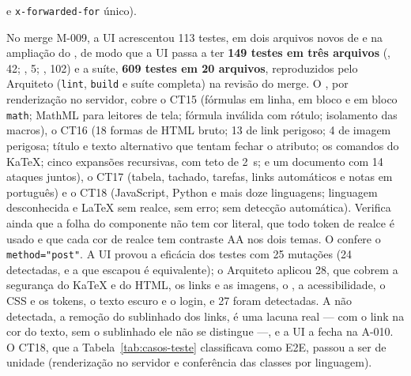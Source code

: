 e \texttt{x-forwarded-for} único).

No merge M-009, a UI acrescentou 113 testes, em dois arquivos novos de  e na ampliação do , de modo que a UI passa a ter \textbf{149 testes em três arquivos} (, 42; , 5; , 102) e a suíte, \textbf{609 testes em 20 arquivos}, reproduzidos pelo Arquiteto (\texttt{lint}, \texttt{build} e suíte completa) na revisão do merge. O , por renderização no servidor, cobre o CT15 (fórmulas em linha, em bloco e em bloco \texttt{math}; MathML para leitores de tela; fórmula inválida com rótulo; isolamento das macros), o CT16 (18 formas de HTML bruto; 13 de link perigoso; 4 de imagem perigosa; título e texto alternativo que tentam fechar o atributo; os comandos do KaTeX; cinco expansões recursivas, com teto de 2~s; e um documento com 14 ataques juntos), o CT17 (tabela, tachado, tarefas, links automáticos e notas em português) e o CT18 (JavaScript, Python e mais doze linguagens; linguagem desconhecida e LaTeX sem realce, sem erro; sem detecção automática). Verifica ainda que a folha do componente não tem cor literal, que todo token de realce é usado e que cada cor de realce tem contraste AA nos dois temas. O  confere o \texttt{method="post"}. A UI provou a eficácia dos testes com 25 mutações (24 detectadas, e a que escapou é equivalente); o Arquiteto aplicou 28, que cobrem a segurança do KaTeX e do HTML, os links e as imagens, o , a acessibilidade, o CSS e os tokens, o texto escuro e o login, e 27 foram detectadas. A não detectada, a remoção do sublinhado dos links, é uma lacuna real --- com o link na cor do texto, sem o sublinhado ele não se distingue ---, e a UI a fecha na A-010. O CT18, que a Tabela~\ref{tab:casos-teste} classificava como E2E, passou a ser de unidade (renderização no servidor e conferência das classes por linguagem).

